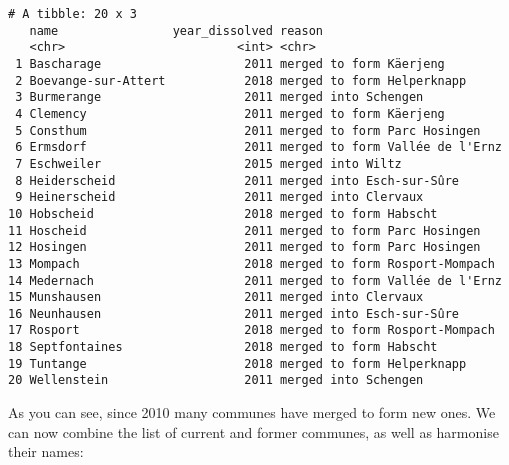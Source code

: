 \documentclass[
  letterpaper,
  DIV=11,
  numbers=noendperiod]{scrartcl}
\begin{document}
\begin{verbatim}
# A tibble: 20 x 3
   name                year_dissolved reason                         
   <chr>                        <int> <chr>                          
 1 Bascharage                    2011 merged to form Käerjeng        
 2 Boevange-sur-Attert           2018 merged to form Helperknapp     
 3 Burmerange                    2011 merged into Schengen           
 4 Clemency                      2011 merged to form Käerjeng        
 5 Consthum                      2011 merged to form Parc Hosingen   
 6 Ermsdorf                      2011 merged to form Vallée de l'Ernz
 7 Eschweiler                    2015 merged into Wiltz              
 8 Heiderscheid                  2011 merged into Esch-sur-Sûre      
 9 Heinerscheid                  2011 merged into Clervaux           
10 Hobscheid                     2018 merged to form Habscht         
11 Hoscheid                      2011 merged to form Parc Hosingen   
12 Hosingen                      2011 merged to form Parc Hosingen   
13 Mompach                       2018 merged to form Rosport-Mompach 
14 Medernach                     2011 merged to form Vallée de l'Ernz
15 Munshausen                    2011 merged into Clervaux           
16 Neunhausen                    2011 merged into Esch-sur-Sûre      
17 Rosport                       2018 merged to form Rosport-Mompach 
18 Septfontaines                 2018 merged to form Habscht         
19 Tuntange                      2018 merged to form Helperknapp     
20 Wellenstein                   2011 merged into Schengen           
\end{verbatim}

As you can see, since 2010 many communes have merged to form new ones.
We can now combine the list of current and former communes, as well as
harmonise their names:
\end{document}
